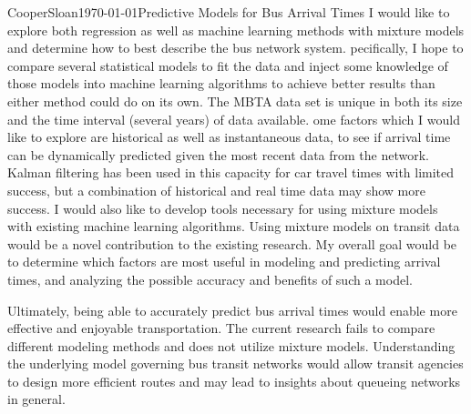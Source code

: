 \documentclass[12pt,letterpaper]{article}
\begin{document}
\begin{mla}{Cooper}{Sloan}{\today}{Predictive Models for Bus Arrival Times}
I would like to explore both regression as well as machine learning methods with mixture models and determine how to best describe the bus network system.  pecifically, I hope to compare several statistical models to fit the data and inject some knowledge of those models into machine learning algorithms to achieve better results than either method could do on its own.  The MBTA data set is unique in both its size and the time interval (several years) of data available. ome factors which I would like to explore are historical as well as instantaneous data, to see if arrival time can be dynamically predicted given the most recent data from the network. Kalman filtering has been used in this capacity for car travel times with limited success, but a combination of historical and real time data may show more success.  I would also like to develop tools necessary for using mixture models with existing machine learning algorithms.  Using mixture models on transit data would be a novel contribution to the existing research.  My overall goal would be to determine which factors are most useful in modeling and predicting arrival times, and analyzing the possible accuracy and benefits of such a model.

Ultimately, being able to accurately predict bus arrival times would enable more effective and enjoyable transportation.  The current research fails to compare different modeling methods and does not utilize mixture models.  Understanding the underlying model governing bus transit networks would allow transit agencies to design more efficient routes and may lead to insights about queueing networks in general.

\end{mla}
\end{document}
